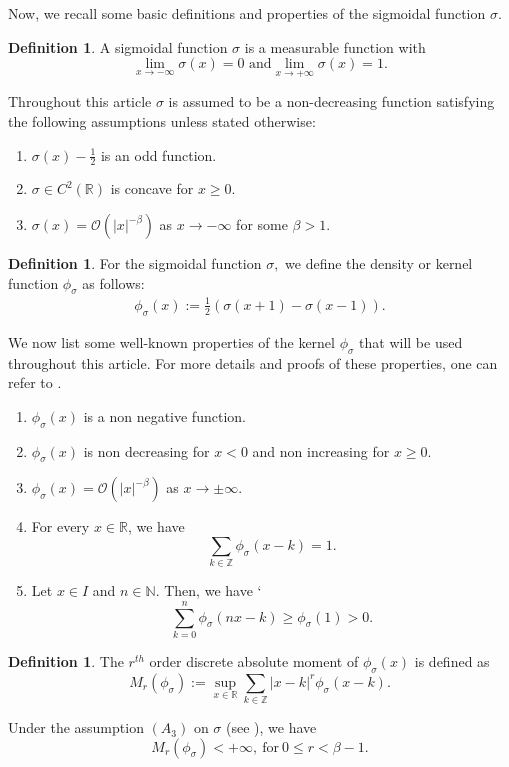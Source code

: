 \documentclass[12pt, reqno]{amsart}
\numberwithin{equation}{section}
\theoremstyle{definition}
\newtheorem{definition}[theorem]{Definition}
\theoremstyle{remark}
\numberwithin{equation}{section}
\newcommand{\Zb}{\mathbb{Z}}
\newcommand{\R}{\mathbb{R}}
\newcommand{\N}{\mathbb{N}}
\begin{document}
Now, we recall some basic definitions and properties of the sigmoidal function $\sigma.$

\begin{definition}
A sigmoidal function $\sigma$ is a measurable function with 
$$\lim_{x\to-\infty}\sigma(x)=0 \,\, \mbox{and} \lim_{x\to+\infty}\sigma(x)=1.$$ 
\end{definition}

Throughout this article $\sigma$ is assumed to be a non-decreasing function satisfying the following assumptions unless stated otherwise: 
\begin{enumerate}
    \item[$(A_1)$] $\sigma(x)-\frac{1}{2}$ is an odd function. 
    \item[$(A_2)$] $\sigma\in C^2(\R)$ is concave for $x\geq0.$ \
     \item[$(A_3)$] $\sigma(x)=\mathcal{O}(|x|^{-\beta})$ as $x\to-\infty$ for some $\beta>1.$ 
\end{enumerate} 

\begin{definition}
    For the sigmoidal function $\sigma,$ we define the density or kernel function $\phi_\sigma$ as follows: 
    \begin{align}
\phi_\sigma(x):= \frac{1}{2}(\sigma(x+1)-\sigma(x-1)).\label{kernel} 
\end{align}
\end{definition}

We now list some well-known properties of the kernel $\phi_\sigma$ that will be used throughout this article. For more details and proofs of these properties, one can refer to \cite{Costar1}.
\begin{enumerate}
\item[$(1)$] $\phi_\sigma(x)$ is a non negative function. 
\item[$(2)$] $\phi_\sigma(x)$ is non decreasing for $x<0$ and non increasing for $x\geq0.$
\item[$(3)$] $\phi_\sigma(x)=\mathcal{O}(|x|^{-\beta})$ as $x\to\pm\infty.$ 
\item[$(4)$] For every $x\in \R$, we have 
$$\sum_{k\in\Zb}\phi_\sigma(x-k)=1.$$
\item[$(5)$] Let $x\in I$ and $n\in{\N}$. Then, we have `
$$\sum_{k=0}^n\phi_\sigma(nx-k)\geq\phi_\sigma(1)>0.$$
\end{enumerate}
\begin{definition}
    The $r^{th}$ order discrete absolute moment of $\phi_\sigma(x)$ is defined as $$M_r(\phi_\sigma):=\sup_{x\in\mathbb{R}}\sum_{k\in\Zb  }|x-k|^r\phi_\sigma(x-k).$$ 
\end{definition}
Under the assumption $(A_3)$ on $\sigma$ (see \cite{Costar1}), we have $$M_r(\phi_\sigma)<+\infty, \  \mbox{for} \ 0\leq r<\beta-1.$$
\end{document}
